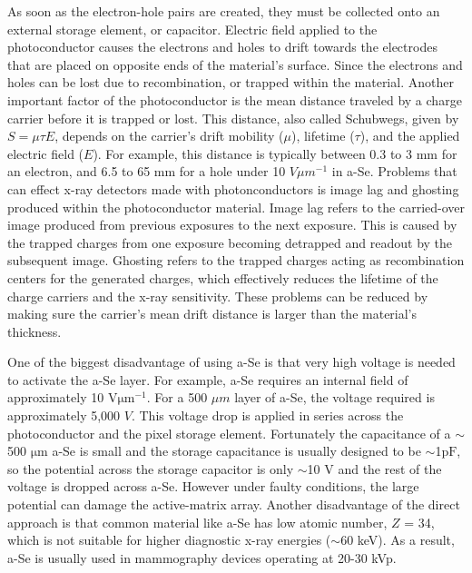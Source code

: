 As soon as the electron-hole pairs are created, they must be collected onto an external storage element, or capacitor.  Electric field applied to the photoconductor causes the electrons and holes to drift towards the electrodes that are placed on opposite ends of the material's surface.  Since the electrons and holes can be lost due to recombination, or trapped within the material.  Another important factor of the photoconductor is the mean distance traveled by a charge carrier before it is trapped or lost.  This distance, also called Schubwegs, given by $S = \mu \tau E$, depends on the carrier's drift mobility ($\mu$), lifetime ($\tau$), and the applied electric field ($E$).  For example, this distance is typically between 0.3 to 3 $\mathrm{mm}$ for an electron, and 6.5 to 65 $\mathrm{mm}$ for a hole under 10 $V \mu m^{-1}$ in a-Se.  Problems that can effect x-ray detectors made with photonconductors is image lag and ghosting produced within the photoconductor material.  Image lag refers to the carried-over image produced from previous exposures to the next exposure.  This is caused by the trapped charges from one exposure becoming detrapped and readout by the subsequent image.  Ghosting refers to the trapped charges acting as recombination centers for the generated charges, which effectively reduces the lifetime of the charge carriers and the x-ray sensitivity.  These problems can be reduced by making sure the carrier's mean drift distance is larger than the material's thickness.

One of the biggest disadvantage of using a-Se is that very high voltage is needed to activate the a-Se layer.  For example, a-Se requires an internal field of approximately 10 $\mathrm{V \mu m^{-1}}$.  For a 500 $\mu m$ layer of a-Se, the voltage required is approximately 5,000 $V$.  This voltage drop is applied in series across the photoconductor and the pixel storage element.  Fortunately the capacitance of a $\sim$500 $\mathrm{\mu m}$ a-Se is small and the storage capacitance is usually designed to be $\sim$1$\mathrm{pF}$, so the potential across the storage capacitor is only $\sim$10 V and the rest of the voltage is dropped across a-Se.  However under faulty conditions, the large potential can damage the active-matrix array.  Another disadvantage of the direct approach is that common material like a-Se has low atomic number, $Z$ = 34, which is not suitable for higher diagnostic x-ray energies ($\sim$60 keV).  As a result, a-Se is usually used in mammography devices operating at 20-30 kVp.


